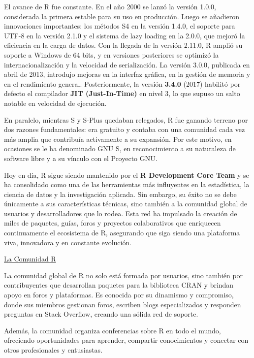 \documentclass[
  letterpaper,
  DIV=11,
  numbers=noendperiod]{scrartcl}
\begin{document}
El avance de R fue constante. En el año 2000 se lanzó la versión 1.0.0,
considerada la primera estable para su uso en producción. Luego se
añadieron innovaciones importantes: los métodos S4 en la versión 1.4.0,
el soporte para UTF-8 en la versión 2.1.0 y el sistema de lazy loading
en la 2.0.0, que mejoró la eficiencia en la carga de datos. Con la
llegada de la versión 2.11.0, R amplió su soporte a Windows de 64 bits,
y en versiones posteriores se optimizó la internacionalización y la
velocidad de serialización. La versión 3.0.0, publicada en abril de
2013, introdujo mejoras en la interfaz gráfica, en la gestión de memoria
y en el rendimiento general. Posteriormente, la versión \textbf{3.4.0}
(2017) habilitó por defecto el compilador \textbf{JIT (Just-In-Time)} en
nivel 3, lo que supuso un salto notable en velocidad de ejecución.

En paralelo, mientras S y S-Plus quedaban relegados, R fue ganando
terreno por dos razones fundamentales: era gratuito y contaba con una
comunidad cada vez más amplia que contribuía activamente a su expansión.
Por este motivo, en ocasiones se le ha denominado GNU S, en
reconocimiento a su naturaleza de software libre y a su vínculo con el
Proyecto GNU.

Hoy en día, R sigue siendo mantenido por el \textbf{R Development Core
Team} y se ha consolidado como una de las herramientas más influyentes
en la estadística, la ciencia de datos y la investigación aplicada. Sin
embargo, su éxito no se debe únicamente a sus características técnicas,
sino también a la comunidad global de usuarios y desarrolladores que lo
rodea. Esta red ha impulsado la creación de miles de paquetes, guías,
foros y proyectos colaborativos que enriquecen continuamente el
ecosistema de R, asegurando que siga siendo una plataforma viva,
innovadora y en constante evolución.

\uline{La Comunidad R}

La comunidad global de R no solo está formada por usuarios, sino también
por contribuyentes que desarrollan paquetes para la biblioteca CRAN y
brindan apoyo en foros y plataformas. Es conocida por su dinamismo y
compromiso, donde sus miembros gestionan foros, escriben blogs
especializados y responden preguntas en Stack Overflow, creando una
sólida red de soporte.

Además, la comunidad organiza conferencias sobre R en todo el mundo,
ofreciendo oportunidades para aprender, compartir conocimientos y
conectar con otros profesionales y entusiastas.
\end{document}
